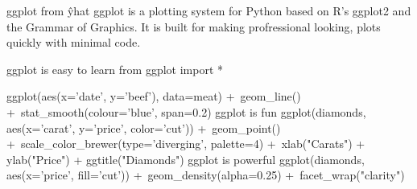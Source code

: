 ggplot from ŷhat
ggplot is a plotting system for Python based on R's ggplot2 and the Grammar of Graphics. It is built for making profressional looking, plots quickly with minimal code.

ggplot is easy to learn
from ggplot import *

ggplot(aes(x='date', y='beef'), data=meat) +\
    geom_line() +\
    stat_smooth(colour='blue', span=0.2)
ggplot is fun
ggplot(diamonds, aes(x='carat', y='price', color='cut')) +\
    geom_point() +\
    scale_color_brewer(type='diverging', palette=4) +\
    xlab("Carats") + ylab("Price") + ggtitle("Diamonds")
ggplot is powerful
ggplot(diamonds, aes(x='price', fill='cut')) +\
    geom_density(alpha=0.25) +\
    facet_wrap("clarity")


